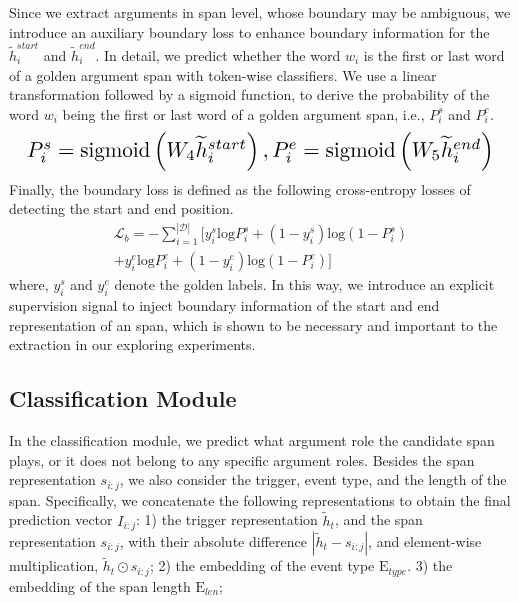 Since we extract arguments in span level, whose boundary may be ambiguous, we introduce an auxiliary boundary loss to enhance boundary information for the $\widetilde{h}_{i}^{start}$ and $\widetilde{h}_{i}^{end}$.
In detail, we predict whether the word $w_i$ is the first or last word of a golden argument span with token-wise classifiers.
We use a linear transformation followed by a sigmoid function, to derive the probability of the word $w_i$ being the first or last word of a golden argument span, i.e., $P^s_i$ and $P^e_i$.
\begin{equation*}
\resizebox{\linewidth}{!}{ $
P^s_i = \mathrm{sigmoid}\left ( W_4 \widetilde{h}_i^{start} \right ) 
,
P^e_i = \mathrm{sigmoid}\left ( W_5 \widetilde{h}_i^{end} \right ) 
$
}
\end{equation*}
Finally, the boundary loss is defined as the following cross-entropy losses of detecting the start and end position.
\begin{equation}
\begin{aligned} 
\mathcal{L}_{b} = - \sum_{i=1}^{\left | \mathcal{D} \right | }
[  y_i^{s} \mathrm{log}P_i^s + \left (1-y_i^{s} \right )\mathrm{log} \left (1-P_i^s \right ) \\
 +y_i^{e}\mathrm{log}P_i^e + \left (1-y_i^{e} \right )\mathrm{log}\left (1-P_i^e \right ) ] 
\end{aligned} 
\end{equation}
where, $y_i^s$ and $y_i^e$ denote the golden labels.
In this way, we introduce an explicit supervision signal to inject boundary information of the start and end representation of an span, which is shown to be necessary and important to the extraction in our exploring experiments.

\subsection{Classification Module}

In the classification module, we predict what argument role the candidate span plays, or it does not belong to any specific argument roles.
Besides the span representation $s_{i:j}$, we also consider the trigger, event type, and the length of the span.
Specifically, we concatenate the following representations to obtain the final prediction vector $I_{i:j}$:
1) the trigger representation $\widetilde{h}_t$, and the span representation $s_{i:j}$, with their absolute difference $\left | \widetilde{h}_t-s_{i:j} \right |$, and element-wise multiplication, $\widetilde{h}_t \odot s_{i:j}$; 
2) the embedding of the event type $\mathrm{E}_{type}$.
3) the embedding of the span length $\mathrm{E}_{len}$;

